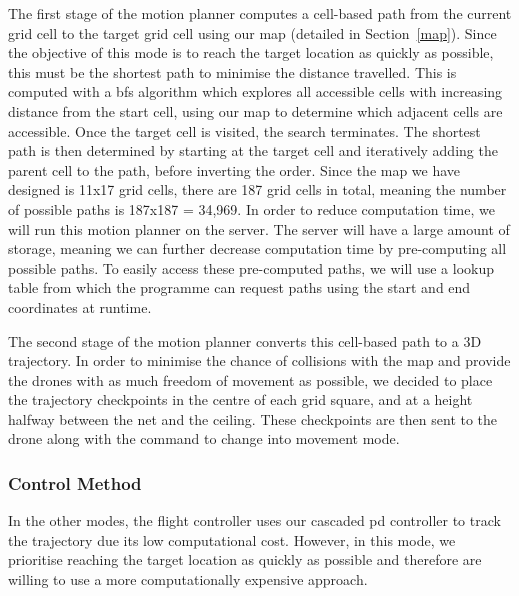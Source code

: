 \documentclass{report_template_oxford}
\begin{document}
The first stage of the motion planner computes a cell-based path from the current grid cell to the target grid cell using our map (detailed in Section~\ref{map}). Since the objective of this mode is to reach the target location as quickly as possible, this must be the shortest path to minimise the distance travelled. This is computed with a \gls{bfs} algorithm which explores all accessible cells with increasing distance from the start cell, using our map to determine which adjacent cells are accessible. Once the target cell is visited, the search terminates. The shortest path is then determined by starting at the target cell and iteratively adding the parent cell to the path, before inverting the order. Since the map we have designed is 11x17 grid cells, there are 187 grid cells in total, meaning the number of possible paths is 187x187 = 34,969. In order to reduce computation time, we will run this motion planner on the server. The server will have a large amount of storage, meaning we can further decrease computation time by pre-computing all possible paths. To easily access these pre-computed paths, we will use a lookup table from which the programme can request paths using the start and end coordinates at runtime.

The second stage of the motion planner converts this cell-based path to a 3D trajectory. In order to minimise the chance of collisions with the map and provide the drones with as much freedom of movement as possible, we decided to place the trajectory checkpoints in the centre of each grid square, and at a height halfway between the net and the ceiling. These checkpoints are then sent to the drone along with the command to change into movement mode.

\subsubsection{Control Method}
In the other modes, the flight controller uses our cascaded \gls{pd} controller to track the trajectory due its low computational cost. However, in this mode, we prioritise reaching the target location as quickly as possible and therefore are willing to use a more computationally expensive approach. 
\end{document}
